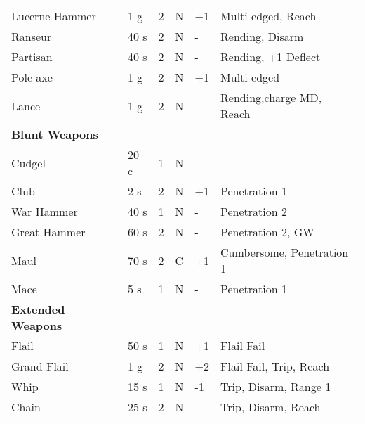 \begin{table}[!ht]
\begin{tabular}{|l|l|l|l|l|l|}
		Lucerne Hammer & 1 g & 2 & N & +1 & Multi-edged, Reach\\ 
		Ranseur & 40 s & 2 & N & - & Rending, Disarm \\ 
		Partisan & 40 s & 2 & N & - & Rending, +1 Deflect\\
        Pole-axe & 1 g & 2 & N & +1 & Multi-edged \\
		Lance & 1 g & 2 & N & - & Rending,charge MD, Reach\\
		\hline
		\textbf{Blunt Weapons} & & & & & \\
		\hline
		Cudgel & 20 c & 1  & N & - & - \\
		Club & 2 s & 2 & N & +1 & Penetration 1 \\
		War Hammer & 40 s & 1 & N & - & Penetration 2 \\ 
		Great Hammer & 60 s & 2 & N & - & Penetration 2, GW \\
		Maul & 70 s & 2 & C & +1 & Cumbersome, Penetration 1 \\
		Mace & 5 s & 1 & N & - & Penetration 1 \\
		\hline
		\textbf{Extended Weapons} & & & & & \\
		\hline
		Flail & 50 s & 1 & N & +1 & Flail Fail \\ 
		Grand Flail & 1 g & 2 & N & +2 & Flail Fail, Trip, Reach \\
		Whip & 15 s & 1 & N & -1 & Trip, Disarm, Range 1\\
		Chain & 25 s & 2 & N & - & Trip, Disarm, Reach\\  
		\hline
	\end{tabular}
\end{table}
